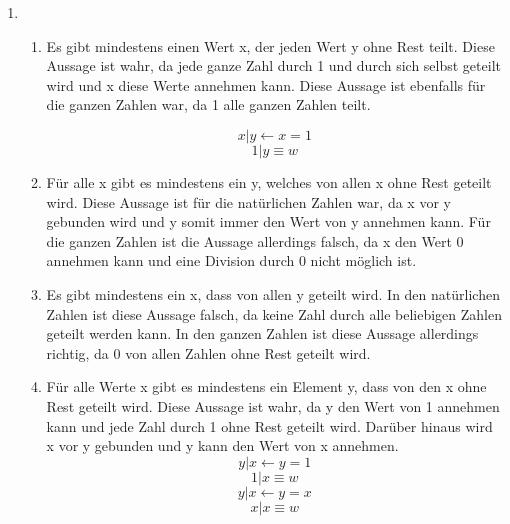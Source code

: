 \documentclass[a4paper]{article}
\begin{document}
	\begin{enumerate}
		\item
		\begin{enumerate}
			\item
			Es gibt mindestens einen Wert x, der jeden Wert y ohne Rest teilt.
			\newline
			Diese Aussage ist wahr, da jede ganze Zahl durch 1 und durch sich selbst geteilt wird und x diese Werte annehmen kann. Diese Aussage ist ebenfalls für die ganzen Zahlen war, da 1 alle ganzen Zahlen teilt.
			
			\begin{equation*}
				x | y \leftarrow x = 1
			\end{equation*}
			\begin{equation*}
				1 | y \equiv w
			\end{equation*}
			
			\item
			Für alle x gibt es mindestens ein y, welches von allen x ohne Rest geteilt wird.
			\newline
			Diese Aussage ist für die natürlichen Zahlen war, da x vor y gebunden wird und y somit immer den Wert von y annehmen kann. Für die ganzen Zahlen ist die Aussage allerdings falsch, da x den Wert 0 annehmen kann und eine Division durch 0 nicht möglich ist.
			
			\item
			Es gibt mindestens ein x, dass von allen y geteilt wird.
			\newline
			In den natürlichen Zahlen ist diese Aussage falsch, da keine Zahl durch alle beliebigen Zahlen geteilt werden kann. In den ganzen Zahlen ist diese Aussage allerdings richtig, da 0 von allen Zahlen ohne Rest geteilt wird.
			
			\item
			Für alle Werte x gibt es mindestens ein Element y, dass von den x ohne Rest geteilt wird.
			\newline
			Diese Aussage ist wahr, da y den Wert von 1 annehmen kann und jede Zahl durch 1 ohne Rest geteilt wird. Darüber hinaus wird x vor y gebunden und y kann den Wert von x annehmen.
			\begin{equation*}
				y | x \leftarrow y = 1
			\end{equation*}
			\begin{equation*}
				1 | x \equiv w
			\end{equation*}
			\begin{equation*}
				y | x \leftarrow y = x
			\end{equation*}
			\begin{equation*}
				x | x \equiv w
			\end{equation*}
		\end{enumerate}
		

\end{enumerate}
\end{document}
